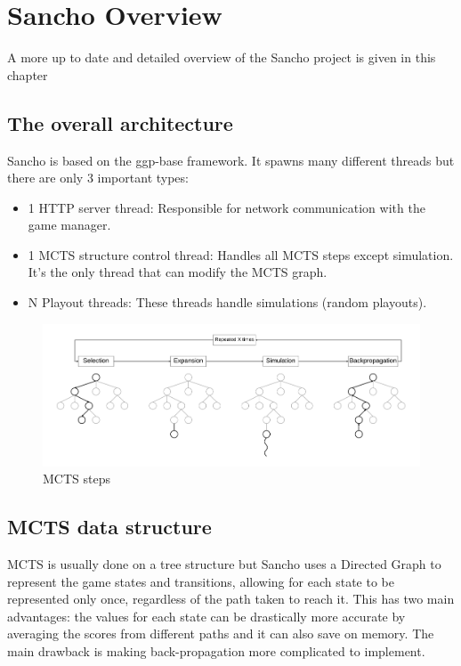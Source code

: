 
\chapter{Sancho Overview}
\label{chapter:sancho_overview}

A more up to date and detailed overview of the Sancho project is given in this chapter

\section{The overall architecture}

Sancho is based on the ggp-base framework.
It spawns many different threads but there are only 3 important types:
\begin{itemize}
	\item 1 HTTP server thread: Responsible for network communication with the game manager.
	\item 1 MCTS structure control thread: Handles all MCTS steps except simulation. It's the only thread that can modify the MCTS graph.
	\item N Playout threads: These threads handle simulations (random playouts).    
\end{itemize}
	
	
\begin{figure}[h]
	\centering
	\includegraphics[width=\textwidth]{images/MCTS.pdf}
	\caption{MCTS steps}
	\label{fig:mcts steps}
\end{figure}

\section{MCTS data structure}
MCTS is usually done on a tree structure but Sancho uses a Directed Graph to represent the game states and transitions, allowing for each state to be represented only once, regardless of the path taken to reach it.
This has two main advantages: the values for each state can be drastically more accurate by averaging the scores from different paths and it can also save on memory.
The main drawback is making back-propagation more complicated to implement.


